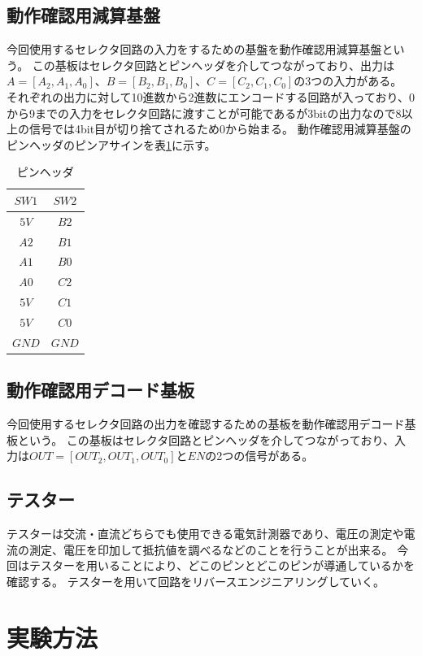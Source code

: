 \documentclass[a4paper,11pt]{ltjsarticle}
\begin{document}
\subsection{動作確認用減算基盤}
今回使用するセレクタ回路の入力をするための基盤を動作確認用減算基盤という。
この基板はセレクタ回路とピンヘッダを介してつながっており、出力は$A= [A_2, A_1, A_0]$、$B = [B_2, B_1, B_0]$、$C = [C_2, C_1, C_0]$の3つの入力がある。
それぞれの出力に対して10進数から2進数にエンコードする回路が入っており、0から9までの入力をセレクタ回路に渡すことが可能であるが3bitの出力なので8以上の信号では4bit目が切り捨てされるため0から始まる。
動作確認用減算基盤のピンヘッダのピンアサインを表\ref{tab:pin}に示す。
\begin{table}[htbp]
  \centering
  \caption{ピンヘッダ}
  \label{tab:pin}
  \begin{tabular}{|c|c|}
    \hline
    $SW1$  & $SW2$  \\
    \hline
    $5V$ & $B2$ \\
    $A2$ & $B1$ \\
    $A1$ & $B0$ \\
    $A0$ & $C2$ \\
    $5V$ & $C1$ \\
    $5V$ & $C0$ \\
    $GND$ & $GND$ \\
    \hline
  \end{tabular}
\end{table}
\subsection{動作確認用デコード基板}
今回使用するセレクタ回路の出力を確認するための基板を動作確認用デコード基板という。
この基板はセレクタ回路とピンヘッダを介してつながっており、入力は$OUT = [OUT_2,OUT_1,OUT_0]$と$EN$の2つの信号がある。
\subsection{テスター}
テスターは交流・直流どちらでも使用できる電気計測器であり、電圧の測定や電流の測定、電圧を印加して抵抗値を調べるなどのことを行うことが出来る。
今回はテスターを用いることにより、どこのピンとどこのピンが導通しているかを確認する。
テスターを用いて回路をリバースエンジニアリングしていく。
\section{実験方法}
\end{document}
